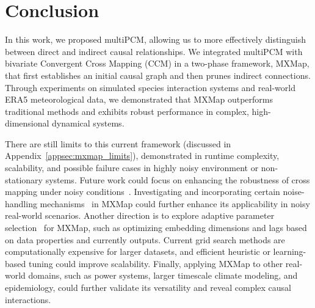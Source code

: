 \section{Conclusion}

In this work, we proposed multiPCM, allowing us to more effectively distinguish between direct and indirect causal relationships. We integrated multiPCM with bivariate Convergent Cross Mapping (CCM) in a two-phase framework, MXMap, that first establishes an initial causal graph and then prunes indirect connections. Through experiments on simulated species interaction systems and real-world ERA5 meteorological data, we demonstrated that MXMap outperforms traditional methods and exhibits robust performance in complex, high-dimensional dynamical systems.

There are still limits to this current framework (discussed in Appendix~\ref{appsec:mxmap_limits}), demonstrated in runtime complexity, scalability, and possible failure cases in highly noisy environment or non-stationary systems. Future work could focus on enhancing the robustness of cross mapping under noisy conditions~\citep{monster2017causal}. Investigating and incorporating certain noise-handling mechanisms~\citep{zhang2024enhancing} in MXMap could further enhance its applicability in noisy real-world scenarios. Another direction is to explore adaptive parameter selection~\citep{shortreed2017outcome, machlanski2023hyperparameter} for MXMap, such as optimizing embedding dimensions and lags based on data properties and currently outputs. Current grid search methods are computationally expensive for larger datasets, and efficient heuristic or learning-based tuning could improve scalability. Finally, applying MXMap to other real-world domains, such as power systems, larger timescale climate modeling, and epidemiology, could further validate its versatility and reveal complex causal interactions.